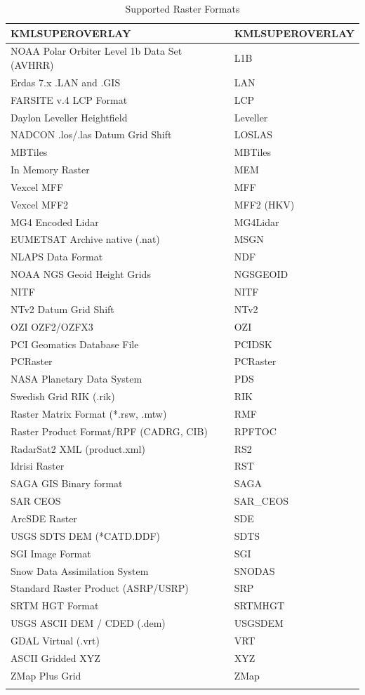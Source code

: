 \documentclass[
	12pt,
	a4paper,
	english,	
	appendixprefix,				     			        
	openany,		     	
	abstracton,		    		    
 	BCOR8mm,		    
]{scrartcl}
\begin{document}
\begin{longtable}{|p{9cm}|p{5cm}|}
KMLSUPEROVERLAY&	KMLSUPEROVERLAY\\
\hline
NOAA Polar Orbiter Level 1b Data Set (AVHRR)&	L1B\\
\hline
Erdas 7.x .LAN and .GIS&	LAN\\
\hline
FARSITE v.4 LCP Format&	LCP\\
\hline
Daylon Leveller Heightfield&	Leveller\\
\hline
NADCON .los/.las Datum Grid Shift&	LOSLAS\\
\hline
MBTiles&	MBTiles\\
\hline
In Memory Raster&	MEM\\
\hline
Vexcel MFF&	MFF\\
\hline
Vexcel MFF2&	MFF2 (HKV)\\
\hline
MG4 Encoded Lidar&	MG4Lidar\\
\hline
EUMETSAT Archive native (.nat)&	MSGN\\
\hline
NLAPS Data Format&	NDF\\
\hline
NOAA NGS Geoid Height Grids&	NGSGEOID\\
\hline
NITF&	NITF\\
\hline
NTv2 Datum Grid Shift&	NTv2\\
\hline
OZI OZF2/OZFX3&	OZI\\
\hline
PCI Geomatics Database File&	PCIDSK\\
\hline
PCRaster&	PCRaster\\
\hline
NASA Planetary Data System&	PDS\\
\hline
Swedish Grid RIK (.rik)&	RIK\\
\hline
Raster Matrix Format (*.rsw, .mtw)&	RMF\\
\hline
Raster Product Format/RPF (CADRG, CIB)&	RPFTOC\\
\hline
RadarSat2 XML (product.xml)&	RS2\\
\hline
Idrisi Raster&	RST\\
\hline
SAGA GIS Binary format&	SAGA\\
\hline
SAR CEOS&	SAR\_CEOS\\
\hline
ArcSDE Raster&	SDE\\
\hline
USGS SDTS DEM (*CATD.DDF)&	SDTS\\
\hline
SGI Image Format&	SGI\\
\hline
Snow Data Assimilation System&	SNODAS\\
\hline
Standard Raster Product (ASRP/USRP)&	SRP\\
\hline
SRTM HGT Format&	SRTMHGT\\
\hline
USGS ASCII DEM / CDED (.dem)&	USGSDEM\\
\hline
GDAL Virtual (.vrt)&	VRT\\
\hline
ASCII Gridded XYZ&	XYZ\\
\hline
ZMap Plus Grid&	ZMap\\
\hline
\caption{Supported Raster Formats}\label{rasterformats} \\
\end{longtable}
\end{document}
